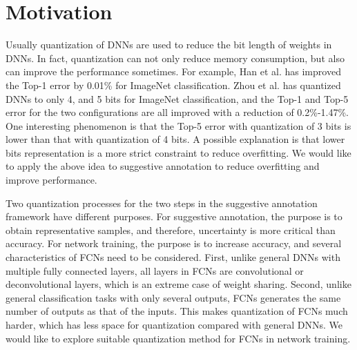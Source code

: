 \documentclass[10pt,twocolumn,letterpaper]{article}
\begin{document}
\section{Motivation}





Usually quantization of DNNs are used to reduce the bit length of weights in DNNs.
In fact, quantization can not only reduce memory consumption, but also can improve the performance sometimes.
For example, Han et al. \cite{han2015deep} has improved the Top-1 error by 0.01\% for ImageNet classification.
Zhou et al. \cite{zhou2017incremental} has quantized DNNs to only 4, and 5 bits for ImageNet classification, and the Top-1 and Top-5 error for the two configurations are all improved with a reduction of 0.2\%-1.47\%.
One interesting phenomenon is that the Top-5 error with quantization of 3 bits is lower than that with quantization of 4 bits.
A possible explanation is that lower bits representation is a more strict constraint to reduce overfitting.
We would like to apply the above idea to suggestive annotation \cite{yang2017suggestive} to reduce overfitting and improve performance.

Two quantization processes for the two steps in the suggestive annotation framework have different purposes.
For suggestive annotation, the purpose is to obtain representative samples, and therefore, uncertainty is more critical than accuracy.
For network training, the purpose is to increase accuracy, and several characteristics of FCNs need to be considered.
First, unlike general DNNs with multiple fully connected layers, all layers in FCNs are convolutional or deconvolutional layers, which is an extreme case of weight sharing.
Second, unlike general classification tasks with only several outputs, FCNs generates the same number of outputs as that of the inputs.
This makes quantization of FCNs much harder, which has less space for quantization compared with general DNNs.
We would like to explore suitable quantization method for FCNs in network training.
\end{document}
